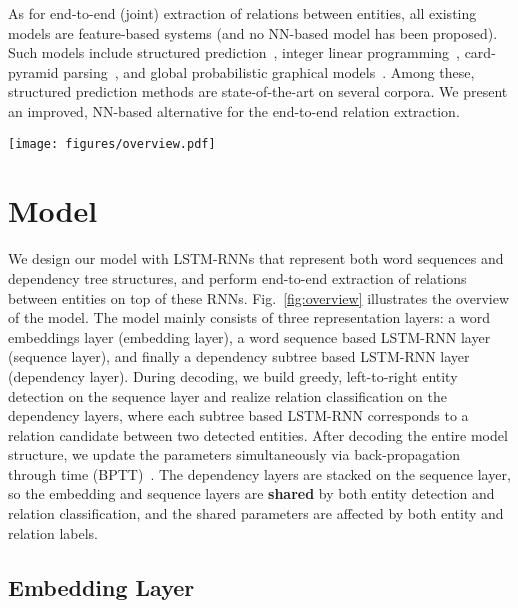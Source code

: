 \documentclass[11pt]{article}
\begin{document}
As for end-to-end (joint) extraction of relations between entities, all existing models are feature-based systems (and no NN-based model has been proposed). Such models include structured
prediction~\cite{li-ji:2014:P14-1,miwa-sasaki:2014:EMNLP2014}, integer linear
programming~\cite{RothYi07,yang-cardie:2013:ACL2013}, card-pyramid
parsing~\cite{kate-mooney:2010:CONLL}, and global probabilistic graphical
models~\cite{yu-lam:2010:POSTERS1,singh2013joint}. Among these, structured prediction methods are state-of-the-art on several corpora.
We present an improved, NN-based alternative for the end-to-end relation extraction. 

\begin{figure*}[t!]
\centering
\texttt{[image: figures/overview.pdf]}
\caption{Our incrementally-decoded end-to-end relation extraction model, with bidirectional sequential and bidirectional tree-structured LSTM-RNNs.}
\label{fig:overview}
\end{figure*}

\section{Model}

We design our model with LSTM-RNNs that represent both word sequences and dependency tree structures, and perform end-to-end extraction of relations between entities on top of these RNNs. 
Fig.~\ref{fig:overview} illustrates the overview of the model.
The model mainly consists of three representation layers: 
a word embeddings layer (embedding layer), a word sequence based LSTM-RNN layer (sequence layer), and finally a dependency subtree based LSTM-RNN layer (dependency layer). 
During decoding, we build greedy, left-to-right entity detection on the sequence layer and realize relation classification on the dependency layers, where each subtree based LSTM-RNN corresponds to a relation candidate between two detected entities. 
After decoding the entire model structure, we update the parameters simultaneously via back-propagation through time (BPTT)~\cite{werbos1990backpropagation}. 
The dependency layers are stacked on the sequence layer, so the embedding and sequence layers are {\bf shared} by both entity detection and relation classification, and the shared parameters are affected by both entity and relation labels. 

\subsection{Embedding Layer}
\end{document}
